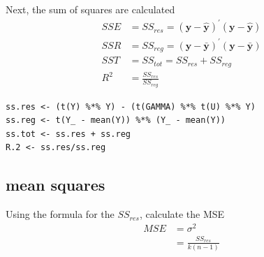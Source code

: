 \documentclass[10pt, twoside, openleft]{article}
\newcommand{\yhat}{\hat{y}} %
\newcommand{\ybar}{\bar{y}} %
\begin{document}
\noindent
Next, the sum of squares are calculated
\begin{equation*}
\begin{aligned}
SSE & = SS_{res} = \left( \mathbf{y} - \mathbf{\yhat} \right)^{'} \left( \mathbf{y} -
\mathbf{\yhat} \right) \\
SSR & = SS_{reg} = \left( \mathbf{y} - \mathbf{\ybar} \right)^{'} \left( \mathbf{y} -
\mathbf{\ybar} \right) \\
SST & = SS_{tot} = SS_{res} + SS_{reg} \\
R^{2} & = \frac{ SS_{res} }{ SS_{reg} } 
\end{aligned}
\end{equation*}
\smallskip

\begin{verbatim}
ss.res <- (t(Y) %*% Y) - (t(GAMMA) %*% t(U) %*% Y)
ss.reg <- t(Y_ - mean(Y)) %*% (Y_ - mean(Y))
ss.tot <- ss.res + ss.reg
R.2 <- ss.res/ss.reg
\end{verbatim}

\begin{center}
\subsection{mean squares}
\vspace{-3ex}
\end{center}

\noindent
Using the formula for the $SS_{res}$, calculate the MSE
\begin{equation*}
\begin{aligned}
MSE & = \sigma^{2} \\
    & = \frac{ SS_{res} }{ k \left( n-1 \right) }
\end{aligned}
\end{equation*}
\smallskip
\end{document}
